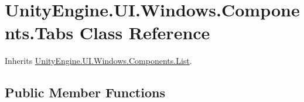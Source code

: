 \hypertarget{class_unity_engine_1_1_u_i_1_1_windows_1_1_components_1_1_tabs}{}\section{Unity\+Engine.\+U\+I.\+Windows.\+Components.\+Tabs Class Reference}
\label{class_unity_engine_1_1_u_i_1_1_windows_1_1_components_1_1_tabs}


Inherits \hyperlink{class_unity_engine_1_1_u_i_1_1_windows_1_1_components_1_1_list}{Unity\+Engine.\+U\+I.\+Windows.\+Components.\+List}.

\subsection*{Public Member Functions}
